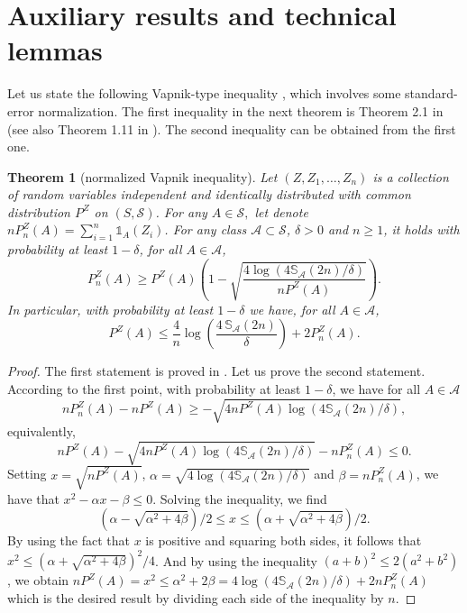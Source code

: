 \documentclass[paper=a4, fontsize=11pt]{scrartcl}
\newcommand{\ind}{\mathds{1}}
\newcommand{\PP}{\mathbb{P}}
\newtheorem{theorem}{Theorem}
\begin{document}
\section{Auxiliary results and technical lemmas}

Let us state the following Vapnik-type inequality \cite{vapnik2015uniform}, which involves some standard-error normalization. The first inequality in the next theorem is Theorem 2.1 in  \cite{anthony1993result} (see also Theorem 1.11 in  \cite{lugosi2002pattern}). The second inequality can be obtained from the first one.


\begin{theorem}[normalized Vapnik inequality] \label{th:vapnik_normalized}
Let $(Z, Z_1, \ldots , Z_n) $ is a collection of random variables independent and identically distributed with common distribution $P^Z$ on $(S,\mathcal S)$. For any $A \in \mathcal{S},$ let denote $nP_n^Z(A) = \sum_{i=1}^n \ind_{A}(Z_i)$. For any class $\mathcal A\subset \mathcal S $, $\delta > 0$ and $n\geq 1$, it holds with probability at least $1 -\delta $, for all $A\in \mathcal A$,
$$ P_n^Z(A) \geq P^Z(A) \left(1-\sqrt { \frac{4 \log( 4\mathbb S_\mathcal A(2n) / \delta) }{ n P^Z(A)} } \right).$$ 
In particular, with probability at least $1-\delta$ we have, for all $A\in \mathcal A$,
$$   P^Z(A) \leq \dfrac{4}{n} \log\left(\dfrac{4\, \mathbb S_\mathcal A(2n)}{\delta} \right) + 2 P_n^Z(A).$$ 
\end{theorem}

\begin{proof}
    The first statement is proved in \cite{anthony1993result}.   Let us  prove the second statement. According to the first point, with probability at least $1 - \delta$, we have for all $A \in \mathcal{A}$ $$n P_n^Z(A) - n P^Z(A) \geq     - \sqrt{  4nP^Z(A)    \log(4\mathbb S_{\mathcal A}(2n) /\delta )   },$$   equivalently,  
    $$nP^Z(A) - \sqrt{  4nP^Z(A)    \log(4\mathbb S_{\mathcal A}(2n) /\delta )   } -  n P_n^Z(A)\leq 0.$$
    Setting $x = \sqrt{nP^Z(A)}$, $\alpha = \sqrt{  4 \log(4\mathbb S_{\mathcal A}(2n) /\delta )}$ and $\beta = nP_n^Z(A)$, we have that $x^2 - \alpha x - \beta \leq 0.$ Solving the inequality, we find  $$( \alpha - \sqrt{\alpha^2 + 4\beta}) / 2 \leq x \leq ( \alpha + \sqrt{\alpha^2 + 4\beta} ) / 2.$$ 
    By using the fact that \(x\) is positive and squaring both sides, it follows that $x^2 \leq ( \alpha + \sqrt{\alpha^2 + 4\beta})^2 / 4$. And by using the inequality \((a+b)^2 \leq 2(a^2 + b^2)\), we obtain $nP^Z(A) = x^2 \leq \alpha^2 + 2\beta = 4 \log(4\mathbb S_{\mathcal A}(2n) /\delta ) + 2nP_n^Z(A)$
    which is the desired result by dividing each side of the inequality by \(n\).   
\end{proof}
\end{document}
